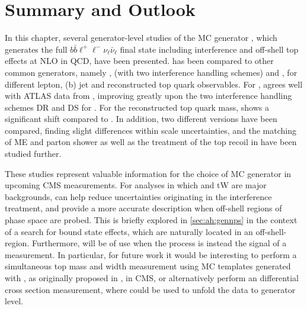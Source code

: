 \section{Summary and Outlook}

In this chapter, several generator-level studies of the MC generator \bbfourl, which generates the full $b \bar{b} \ell^+ \ell^- \nu_{\ell} \bar{\nu}_{\ell}$ final state including \tttW interference and off-shell top effects at NLO in QCD, have been presented. \bbfourl has been compared to other common \ttbar generators, namely \hvq, \ST (with two interference handling schemes) and \ttb, for different lepton, (b) jet and reconstructed top quark observables. For \mblminimax, \bbfourl agrees well with ATLAS data from , improving greatly upon the two interference handling schemes DR and DS for \tttWsum. For the reconstructed top quark mass, \bbfourl shows a significant shift compared to \tttWsum. In addition, two different \bbfourl versions have been compared, finding slight differences within scale uncertainties, and the matching of ME and parton shower as well as the treatment of the top recoil in \bbfourl have been studied further.

These studies represent valuable information for the choice of \ttbar MC generator in upcoming CMS measurements. For analyses in which \ttbar and tW are major backgrounds, \bbfourl can help reduce uncertainties originating in the \tttW interference treatment, and provide a more accurate description when off-shell regions of phase space are probed. This is briefly explored in \cref{sec:ah:gennps} in the context of a search for \ttbar bound state effects, which are naturally located in an off-shell-region. Furthermore, \bbfourl will be of use when the \pptt process is instead the signal of a measurement. In particular, for future work it would be interesting to perform a simultaneous top mass and width measurement using MC templates generated with \bbfourl, as originally proposed in , in CMS, or alternatively perform an differential \tttWsum cross section measurement, where \bbfourl could be used to unfold the data to generator level. 
